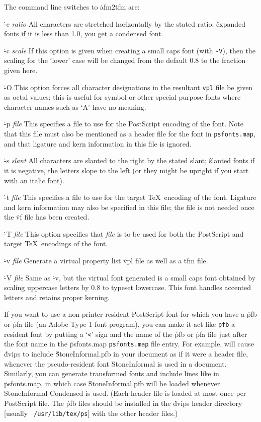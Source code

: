 The command line switches to \.{afm2tfm} are:

{\options
\.{-e {\it ratio}}
All characters are stretched horizontally by the stated ratio;
\^{expanded fonts}
if it is less than 1.0, you get a condensed font.

\.{-c {\it scale}}
If this option is given when creating a small caps font
(with {\tt -V}), then the scaling for the `lower'
case will be changed from the default 0.8 to the fraction
given here.

\.{-O}
This option forces all character designations in the resultant
{\tt vpl} file be given as octal values; this is useful for
symbol or other special-purpose fonts where character names such
as `A' have no meaning.

\.{-p {\it file}}
This specifies a file to use for the PostScript encoding of the
font.  Note that this file must also be mentioned as a header
file for the font in {\tt psfonts.map}, and that ligature
and kern information in this file is ignored.

\.{-s {\it slant}}
All characters are slanted to the right by the stated slant;
\^{slanted fonts}
if it is negative, the letters slope to the left (or they might be
upright if you start with an italic font).

\.{-t {\it file}}
This specifies a file to use for the target \TeX\ encoding of the
font.  Ligature and kern information may also be specified in this
file; the file is not needed once the \.{vf} file has been created.

\.{-T {\it file}}
This option specifies that {\it file} is to be used for both
the PostScript and target \TeX\ encodings of the font.

\.{-v {\it file}}
Generate a virtual property list \.{vpl} file as well as a \.{tfm} file.

\.{-V {\it file}}
Same as \.{-v}, but the virtual font generated is a small caps font obtained
by scaling uppercase letters by 0.8 to typeset lowercase. This font
handles accented letters and retains proper kerning.\par}


If you want to use a non-printer-resident PostScript font for which you have
a \.{pfb} or \.{pfa} file (an Adobe Type 1 font program),
you can make it act like
\^{{\tt pfb}}
a resident font by putting a `{\tt <}' sign
and the name of the \.{pfb} or \.{pfa} file just after the font name in the
\.{psfonts.map}
\^{{\tt psfonts.map}}
file entry. For example,
\noindent
will cause \.{dvips} to include \.{StoneInformal.pfb} in your document as if
it were a header file, whenever the pseudo-resident font StoneInformal is
used in a document.   Similarly, you can generate transformed fonts and
include lines like
\noindent
in \.{psfonts.map}, in which case \.{StoneInformal.pfb} will be loaded
whenever StoneInformal-Condensed is used. (Each header file is loaded
at most once per PostScript file. The \.{pfb} files should be
installed in the \.{dvips} header directory [usually {\tt
/usr/lib/tex/ps}] with the other header files.)

